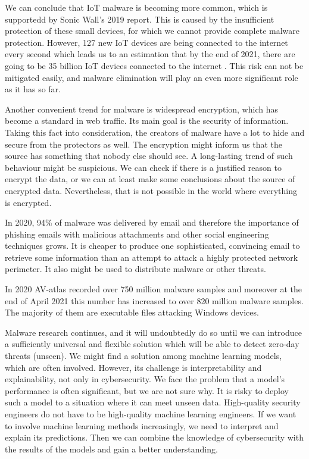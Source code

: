 We can conclude that IoT malware is becoming more common, which is supportedd by Sonic Wall's 2019 report. This is caused by the insufficient protection of these small devices, for which we cannot provide complete malware protection. However, 127 new IoT devices are being connected to the internet every second which leads us to an estimation that by the end of 2021, there are going to be 35 billion IoT devices connected to the internet \cite{TheIoTRu52:online}. This risk can not be mitigated easily, and malware elimination will play an even more significant role as it has so far.

Another convenient trend for malware is widespread encryption, which has become a standard in web traffic. Its main goal is the security of information. Taking this fact into consideration, the creators of malware have a lot to hide and secure from the protectors as well. The encryption might inform us that the source has something that nobody else should see. A long-lasting trend of such behaviour might be suspicious. We can check if there is a justified reason to encrypt the data, or we can at least make some conclusions about the source of encrypted data. Nevertheless, that is not possible in the world where everything is encrypted.

In 2020, 94\% of malware was delivered by email \cite{Topcyber13:online} and therefore the importance of phishing emails with malicious attachments and other social engineering techniques grows. It is cheaper to produce one sophisticated, convincing email to retrieve some information than an attempt to attack a highly protected network perimeter. It also might be used to distribute malware or other threats.

In 2020 AV-atlas \cite{AVATLASM39:online} recorded over 750 million malware samples and moreover at the end of April 2021 this number has increased to over 820 million malware samples. The majority of them are executable files attacking Windows devices.

Malware research continues, and it will undoubtedly do so until we can introduce a sufficiently universal and flexible solution which will be able to detect zero-day threats (unseen). We might find a solution among machine learning models, which are often involved. However, its challenge is interpretability and explainability, not only in cybersecurity. We face the problem that a model's performance is often significant, but we are not sure why. It is risky to deploy such a model to a situation where it can meet unseen data. High-quality security engineers do not have to be high-quality machine learning engineers. If we want to involve machine learning methods increasingly, we need to interpret and explain its predictions. Then we can combine the knowledge of cybersecurity with the results of the models and gain a better understanding. 


